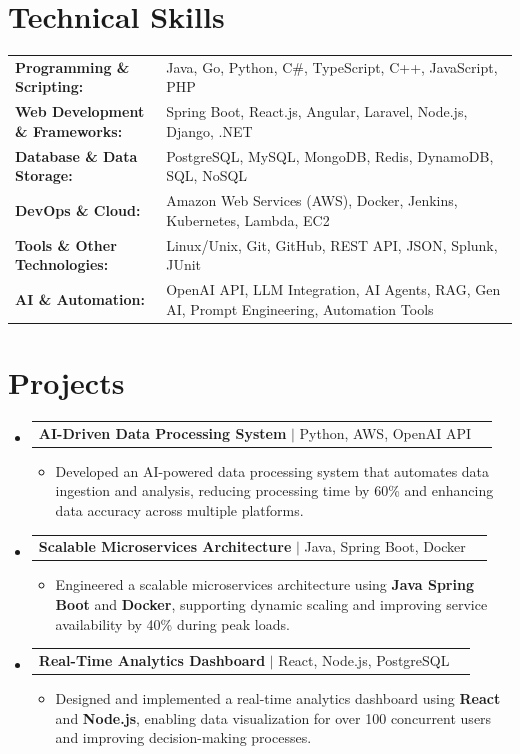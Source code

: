 \documentclass[letterpaper,10pt]{article}
\makeatletter
\newcommand{\resumeItem}[1]{
  \item{\fontsize{8pt}{9pt}\selectfont
    #1 \vspace{-3pt}
  }
}
\newcommand{\resumeProjectHeading}[2]{
    \item
    \begin{tabular*}{1.001\textwidth}{l@{\extracolsep{\fill}}r}
      \fontsize{8.5pt}{10pt}#1 & \textbf{\fontsize{8.5pt}{10pt} #2}\\
    \end{tabular*}\vspace{-7pt}
}
\newcommand{\resumeSubHeadingListStart}{\begin{itemize}[leftmargin=0pt, label={}]}
\newcommand{\resumeSubHeadingListEnd}{\end{itemize}}
\newcommand{\resumeItemListStart}{\begin{itemize}[leftmargin=*]}
\newcommand{\resumeItemListEnd}{\end{itemize}\vspace{-5pt}}
\makeatother
\begin{document}
\section{Technical Skills}
        \vspace{-14pt}
        \begin{table}[h]
            \fontsize{8pt}{9pt}\selectfont
            \begin{tabular}{p{0.3\linewidth} p{0.7\linewidth}}
                \textbf{Programming \& Scripting:} & Java, Go, Python, C\#, TypeScript, C++, JavaScript, PHP \\
                \textbf{Web Development \& Frameworks:} & Spring Boot, React.js, Angular, Laravel, Node.js, Django, .NET \\
                \textbf{Database \& Data Storage:} & PostgreSQL, MySQL, MongoDB, Redis, DynamoDB, SQL, NoSQL \\
                \textbf{DevOps \& Cloud:} & Amazon Web Services (AWS), Docker, Jenkins, Kubernetes, Lambda, EC2 \\
                \textbf{Tools \& Other Technologies:} & Linux/Unix, Git, GitHub, REST API, JSON, Splunk, JUnit \\
                \textbf{AI \& Automation:} & OpenAI API, LLM Integration, AI Agents, RAG, Gen AI, Prompt Engineering, Automation Tools \\
            \end{tabular}
        \end{table}
 \vspace{-18pt}

\section{Projects}
    \vspace{-5pt}
    \resumeSubHeadingListStart
          \resumeProjectHeading
            {\textbf{AI-Driven Data Processing System} $|$ Python, AWS, OpenAI API}{}
            \resumeItemListStart
                \resumeItem{Developed an AI-powered data processing system that automates data ingestion and analysis, reducing processing time by 60\% and enhancing data accuracy across multiple platforms.}
            \resumeItemListEnd
        \vspace{-12pt}
    
        \resumeProjectHeading
            {\textbf{Scalable Microservices Architecture} $|$ Java, Spring Boot, Docker}{}
        \resumeItemListStart
                \resumeItem{Engineered a scalable microservices architecture using \textbf{Java Spring Boot} and \textbf{Docker}, supporting dynamic scaling and improving service availability by 40\% during peak loads.}
        \resumeItemListEnd
      \vspace{-12pt}
      \resumeProjectHeading
        {\textbf{Real-Time Analytics Dashboard} $|$ React, Node.js, PostgreSQL}{}
    \resumeItemListStart
            \resumeItem{Designed and implemented a real-time analytics dashboard using \textbf{React} and \textbf{Node.js}, enabling data visualization for over 100 concurrent users and improving decision-making processes.}
    \resumeItemListEnd
    \resumeSubHeadingListEnd
\end{document}
